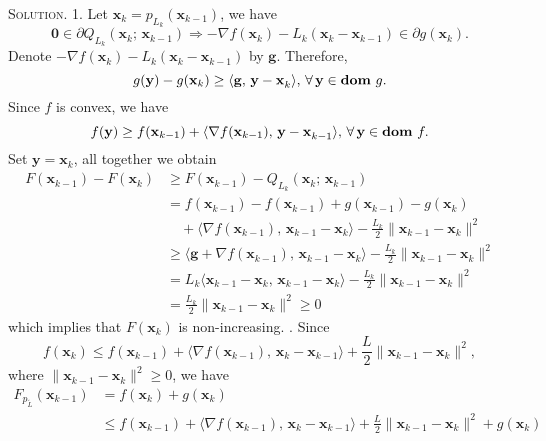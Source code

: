 \documentclass[12pt, a4paper, oneside]{ctexart}
\newenvironment{solution}{\par\noindent\textsc{Solution. }}{\\\par}
\DeclareMathOperator*{\dom}{\bf dom\,}
\begin{document}
\begin{solution}
	1. Let $\mathbf{x}_k = p_{L_k}(\mathbf{x}_{k - 1})$, we have
	\[
	\mathbf{0} \in \partial Q_{L_k}(\mathbf{x}_k;\, \mathbf{x}_{k - 1}) \Rightarrow -\nabla f(\mathbf{x}_k) - L_k (\mathbf{x}_k - \mathbf{x}_{k - 1}) \in \partial g(\mathbf{x}_k).
	\]
	Denote $-\nabla f(\mathbf{x}_k) - L_k (\mathbf{x}_k - \mathbf{x}_{k - 1})$ by $\mathbf{g}$. Therefore, 
	\[
	g(\mathbf{y}) - g(\mathbf{x}_k) \geq \langle\mathbf{g},\, \mathbf{y - x}_k\rangle,\, \forall\, \mathbf{y} \in \dom g.
	\]
	Since $f$ is convex, we have
	\[
	f(\mathbf{y}) \geq f(\mathbf{x}_{k - 1}) + \langle\nabla f(\mathbf{x}_{k - 1}),\, \mathbf{y - x}_{k - 1}\rangle,\, \forall\, \mathbf{y} \in \dom f.
	\]
	Set $\mathbf{y} = \mathbf{x}_k$, all together we obtain
	\begin{align*}
		F(\mathbf{x}_{k - 1}) - F(\mathbf{x}_k) & \geq  F(\mathbf{x}_{k - 1}) - Q_{L_k}(\mathbf{x}_k;\, \mathbf{x}_{k - 1}) \\
		& = f(\mathbf{x}_{k - 1}) - f(\mathbf{x}_{k - 1}) + g(\mathbf{x}_{k - 1}) - g(\mathbf{x}_k) \\
		& \quad + \langle\nabla f(\mathbf{x}_{k - 1}),\, \mathbf{x}_{k - 1} - \mathbf{x}_k\rangle - \frac{L_k}{2}\|\mathbf{x}_{k - 1} - \mathbf{x}_k\|^2 \\
		& \geq \langle\mathbf{g} + \nabla f(\mathbf{x}_{k - 1}),\, \mathbf{x}_{k - 1} - \mathbf{x}_k\rangle - \frac{L_k}{2}\|\mathbf{x}_{k - 1} - \mathbf{x}_k\|^2 \\
		& = L_k \langle\mathbf{x}_{k - 1} - \mathbf{x}_k,\, \mathbf{x}_{k - 1} - \mathbf{x}_k\rangle - \frac{L_k}{2}\|\mathbf{x}_{k - 1} - \mathbf{x}_k\|^2 \\
		& = \frac{L_k}{2}\|\mathbf{x}_{k - 1} - \mathbf{x}_k\|^2 \geq 0
	\end{align*}
	which implies that $F(\mathbf{x}_k)$ is non-increasing.
	\newline{}. Since
	\[
	f(\mathbf{x}_k) \leq f(\mathbf{x}_{k - 1}) + \langle\nabla f(\mathbf{x}_{k - 1}),\, \mathbf{x}_k - \mathbf{x}_{k - 1}\rangle + \frac{L}{2}\|\mathbf{x}_{k - 1} - \mathbf{x}_k\|^2,
	\]
	where $\|\mathbf{x}_{k - 1} - \mathbf{x}_k\|^2 \geq 0$, we have
	\begin{align*}
		F_{p_{\widetilde{L}}}(\mathbf{x}_{k - 1}) & = f(\mathbf{x}_k) + g(\mathbf{x}_k) \\
		& \leq f(\mathbf{x}_{k - 1}) + \langle\nabla f(\mathbf{x}_{k - 1}),\, \mathbf{x}_k - \mathbf{x}_{k - 1}\rangle + \frac{L}{2}\|\mathbf{x}_{k - 1} - \mathbf{x}_k\|^2 + g(\mathbf{x}_k) \\

\end{align*}
\end{solution}
\end{document}
